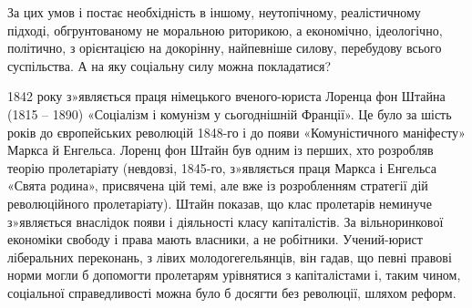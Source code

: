 \documentclass{kapital}
\begin{document}
     За цих умов і постає необхідність в іншому, неутопічному, реалістичному підході, обгрунтованому не моральною риторикою, а економічно, ідеологічно, політично, з орієнтацією на докорінну, найпевніше силову, перебудову всього суспільства. А на яку соціальну силу можна покладатися?    
 
	1842 року з»являється праця німецького вченого-юриста Лоренца фон Штайна (1815 – 1890) «Соціалізм і комунізм у сьогоднішній Франції». Це було за  шість років до європейських революцій 1848-го і до появи «Комуністичного маніфесту» Маркса й Енгельса. Лоренц фон Штайн був одним із перших, хто розробляв теорію пролетаріату (невдовзі, 1845-го, з»являється праця Маркса і Енгельса «Свята родина», присвячена цій темі, але вже із розробленням стратегії дій революційного пролетаріату). Штайн показав, що клас пролетарів неминуче з»являється внаслідок появи і  діяльності класу капіталістів. За вільноринкової економіки свободу і права мають власники, а не робітники. Учений-юрист ліберальних переконань, з лівих молодогегельянців, він гадав, що певні правові норми могли б допомогти пролетарям урівнятися з капіталістами і, таким чином, соціальної справедливості  можна було б досягти без революції, шляхом реформ.
 
\end{document}
